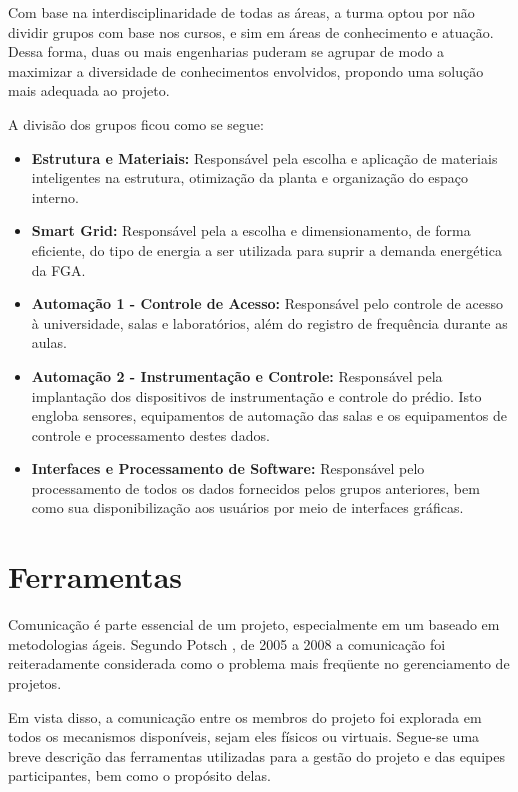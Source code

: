 Com base na interdisciplinaridade de todas as áreas, a turma optou por não dividir grupos com base nos cursos, e sim em áreas de conhecimento e atuação. Dessa forma, duas ou mais engenharias puderam se agrupar de modo a maximizar a diversidade de conhecimentos envolvidos, propondo uma solução mais adequada ao projeto.

A divisão dos grupos ficou como se segue:

	\begin{itemize}
		\item \textbf{Estrutura e Materiais:} Responsável pela escolha e aplicação de materiais inteligentes na estrutura, otimização da planta e organização do espaço interno.
		\item \textbf{Smart Grid:} Responsável pela a  escolha e dimensionamento, de forma eficiente, do tipo de energia a ser utilizada para suprir a demanda energética da FGA.
        \item \textbf{Automação 1 - Controle de Acesso:} Responsável pelo controle de acesso à universidade, salas e laboratórios, além do registro de frequência durante as aulas.
        \item \textbf{Automação 2 - Instrumentação e Controle:} 	Responsável pela implantação dos dispositivos de instrumentação e controle do prédio. Isto engloba sensores, equipamentos de automação das salas e os equipamentos de controle e processamento destes dados.
        \item \textbf{Interfaces e Processamento de Software:} Responsável pelo processamento de todos os dados fornecidos pelos grupos anteriores, bem como sua disponibilização aos usuários por meio de interfaces gráficas.
	\end{itemize}


\chapter{Ferramentas}
Comunicação é parte essencial de um projeto, especialmente em um baseado em metodologias ágeis. Segundo Potsch \cite{potsch2009}, de 2005 a
 2008 a comunicação foi reiteradamente considerada como o problema mais freqüente no gerenciamento de projetos.

Em vista disso, a comunicação entre os membros do projeto foi explorada em todos os mecanismos disponíveis, sejam eles físicos ou virtuais.
	Segue-se uma breve descrição das ferramentas utilizadas para a gestão do projeto e das equipes participantes, bem como o propósito delas.

